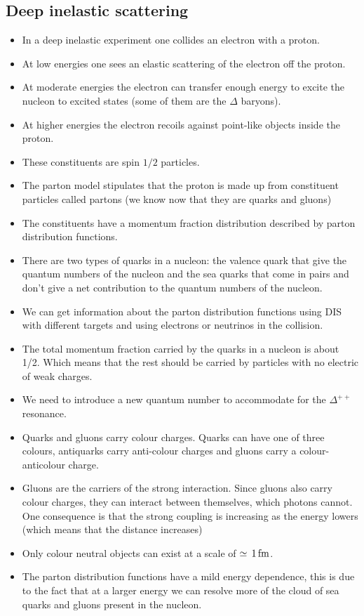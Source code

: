 \documentclass[12pt]{article}
\begin{document}
\subsection{Deep inelastic scattering}
\begin{itemize}
\item In a deep inelastic experiment one collides an electron with a proton.
\item At low energies one sees an elastic scattering of the electron off the proton.
\item At moderate energies the electron can transfer enough energy to excite the nucleon to excited states (some of them are the $\Delta$ baryons).
\item At higher energies the electron recoils against point-like objects inside the proton.
\item These constituents are spin $1/2$ particles.
  \item The parton model stipulates that the proton is made up from constituent particles called partons (we know now that they are quarks and gluons) 
  \item The constituents have a momentum fraction distribution described by parton distribution functions.
    \item There are two types of quarks in a nucleon: the valence quark that give the quantum numbers of the nucleon and the sea quarks that come in pairs and don't give a net contribution to the quantum numbers of the nucleon.
  \item We can get information about the parton distribution functions using DIS with different targets and using electrons or neutrinos in the collision.
  \item The total momentum fraction carried by the quarks in a nucleon is about 1/2. Which means that the rest should be carried by particles with no electric of weak charges.
  \item We need to introduce a new quantum number to accommodate for the $\Delta^{++}$ resonance.
  \item Quarks and gluons carry colour charges. Quarks can have one of three colours, antiquarks carry anti-colour charges and gluons carry a colour-anticolour charge.
  \item Gluons are the carriers of the strong interaction. Since gluons also carry colour charges, they can interact between themselves, which photons cannot. One consequence is that the strong coupling is increasing as the energy lowers (which means that the distance increases)
  \item Only colour neutral objects can exist at a scale of $\simeq \, 1\,\rm{fm}$.
    \item The parton distribution functions have a mild energy dependence, this is due to the fact that at a larger energy we can resolve more of the cloud of sea quarks and gluons present in the nucleon.
\end{itemize}
\end{document}
